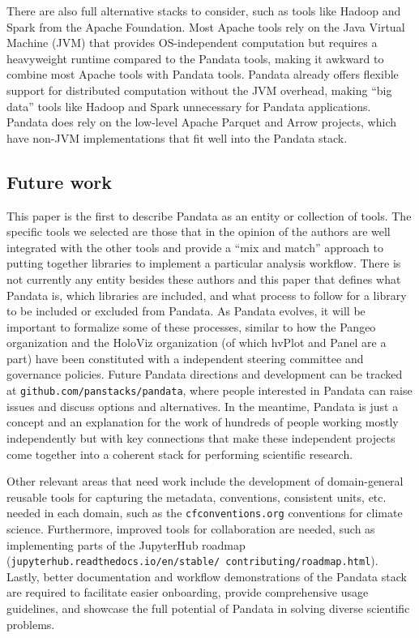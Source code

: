 There are also full alternative stacks to consider, such as tools like Hadoop \cite{white:hadoop15} and Spark \cite{zaharia:cacm16} from the Apache Foundation. Most Apache tools rely on the Java Virtual Machine (JVM) that provides OS-independent computation but requires a heavyweight runtime compared to the Pandata tools, making it awkward to combine most Apache tools with Pandata tools. Pandata already offers flexible support for distributed computation without the JVM overhead, making ``big data'' tools like Hadoop and Spark unnecessary for Pandata applications. Pandata does rely on the low-level Apache Parquet and Arrow projects, which have non-JVM implementations that fit well into the Pandata stack.

\subsection{Future work}
This paper is the first to describe Pandata as an entity or collection of tools. The specific tools we selected are those that in the opinion of the authors are well integrated with the other tools and provide a ``mix and match'' approach to putting together libraries to implement a particular analysis workflow. There is not currently any entity besides these authors and this paper that defines what Pandata is, which libraries are included, and what process to follow for a library to be included or excluded from Pandata. As Pandata evolves, it will be important to formalize some of these processes, similar to how the Pangeo organization and the HoloViz organization (of which hvPlot and Panel are a part) have been constituted with a independent steering committee and governance policies. Future Pandata directions and development can be tracked at \texttt{github.com/panstacks/pandata}, where people interested in Pandata can raise issues and discuss options and alternatives. In the meantime, Pandata is just a concept and an explanation for the work of hundreds of people working mostly independently but with key connections that make these independent projects come together into a coherent stack for performing scientific research.

Other relevant areas that need work include the development of domain-general reusable tools for capturing the metadata, conventions, consistent units, etc. needed in each domain, such as the \texttt{cfconventions.org} conventions for climate science. Furthermore, improved tools for collaboration are needed, such as implementing parts of the JupyterHub roadmap (\texttt{jupyterhub.readthedocs.io/en/stable/ contributing/roadmap.html}). Lastly, better documentation and workflow demonstrations of the Pandata stack are required to facilitate easier onboarding, provide comprehensive usage guidelines, and showcase the full potential of Pandata in solving diverse scientific problems.


